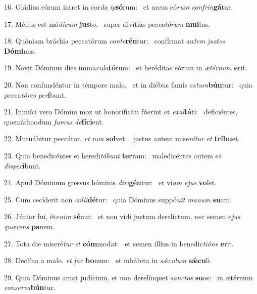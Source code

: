 16. Gládius eórum intret in cor\textit{da} \textit{ip}\textbf{só}rum: \ast\  et arcus eó\textit{rum} \textit{con}\textit{frin}\textbf{gá}tur.\

17. Mélius est mó\textit{di}\textit{cum} \textbf{jus}to, \ast\  super divítias pec\textit{ca}\textit{tó}\textit{rum} \textbf{mul}tas.\

18. Quóniam bráchia peccatórum \textit{con}\textit{te}\textbf{rén}tur: \ast\  confírmat au\textit{tem} \textit{jus}\textit{tos} \textbf{Dó}\textbf{mi}nus.\

19. Novit Dóminus dies imma\textit{cu}\textit{la}\textbf{tó}rum: \ast\  et heréditas eórum in \textit{æ}\textit{tér}\textit{num} \textbf{e}rit.\

20. Non confundéntur in témpore malo, \dag\  et in diébus famis sa\textit{tu}\textit{ra}\textbf{bún}tur: \ast\  quia pecca\textit{tó}\textit{res} \textit{per}\textbf{í}bunt.\

21. Inimíci vero Dómini mox ut honorificáti fúerint et \textit{ex}\textit{al}\textbf{tá}ti: \ast\  deficiéntes, quemádmodum \textit{fu}\textit{mus} \textit{de}\textbf{fí}\textbf{ci}ent.\

22. Mutuábitur peccátor, \textit{et} \textit{non} \textbf{sol}vet: \ast\  justus autem mise\textit{ré}\textit{tur} \textit{et} \textbf{trí}\textbf{bu}et.\

23. Quia benedicéntes ei heredi\textit{tá}\textit{bunt} \textbf{ter}ram: \ast\  maledicéntes autem e\textit{i} \textit{dis}\textit{per}\textbf{í}bunt.\

24. Apud Dóminum gressus hóminis \textit{di}\textit{ri}\textbf{gén}tur: \ast\  et vi\textit{am} \textit{e}\textit{jus} \textbf{vo}let.\

25. Cum cecíderit non \textit{col}\textit{li}\textbf{dé}tur: \ast\  quia Dóminus suppó\textit{nit} \textit{ma}\textit{num} \textbf{su}am.\

26. Júnior fui, ét\textit{e}\textit{nim} \textbf{sé}nui: \ast\  et non vidi justum derelíctum, nec semen e\textit{jus} \textit{quæ}\textit{rens} \textbf{pa}nem.\

27. Tota die miseré\textit{tur} \textit{et} \textbf{cóm}modat: \ast\  et semen illíus in benedic\textit{ti}\textit{ó}\textit{ne} \textbf{e}rit.\

28. Declína a malo, \textit{et} \textit{fac} \textbf{bo}num: \ast\  et inhábita in \textit{sǽ}\textit{cu}\textit{lum} \textbf{sǽ}\textbf{cu}li.\

29. Quia Dóminus amat judícium, et non derelínquet \textit{sanc}\textit{tos} \textbf{su}os: \ast\  in ætérnum \textit{con}\textit{ser}\textit{va}\textbf{bún}tur.\

